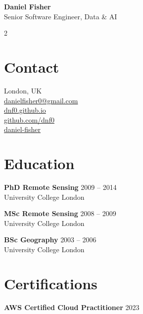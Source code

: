 \documentclass[10pt,a4paper]{article}
\newcommand{\cvitem}[2]{\textbf{#1} \hspace*{\fill} {\small\color{textlight}#2}\\}
\newcommand{\cvsubitem}[1]{{\small\color{textlight}#1}\\}
\begin{document}
\pagestyle{empty}

\begin{flushleft}
    {\Huge \bfseries \color{primary} Daniel Fisher} \\[0.5em]
    {\large \color{secondary} Senior Software Engineer, Data \& AI}
\end{flushleft}
\vspace{1em}

\begin{paracol}{2}

\begin{leftcolumn}
\raggedright

\section*{Contact}
\faMapMarker \hspace{0.5em} London, UK \\
\faEnvelope \hspace{0.5em} \href{mailto:danielfisher0@gmail.com}{danielfisher0@gmail.com} \\
\faGlobe \hspace{0.5em} \href{https://dnf0.github.io/}{dnf0.github.io} \\
\faGithub \hspace{0.5em} \href{https://github.com/dnf0}{github.com/dnf0} \\
\faLinkedin \hspace{0.5em} \href{https://linkedin.com/in/daniel-fisher-55703271}{daniel-fisher}

\section*{Education}
\cvitem{PhD Remote Sensing}{2009 -- 2014}
\cvsubitem{University College London}
\vspace{0.5em}

\cvitem{MSc Remote Sensing}{2008 -- 2009}
\cvsubitem{University College London}
\vspace{0.5em}

\cvitem{BSc Geography}{2003 -- 2006}
\cvsubitem{University College London}

\section*{Certifications}
\cvitem{AWS Certified Cloud Practitioner}{2023}
\vspace{0.5em}


\end{leftcolumn}
\end{paracol}
\end{document}
